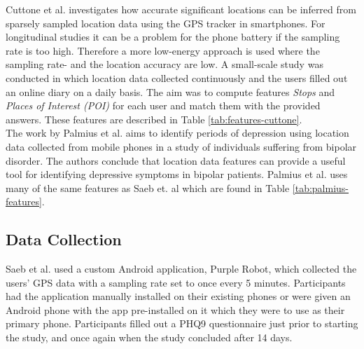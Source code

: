 


Cuttone et al. \cite{sparse-location-2014} investigates how accurate significant locations can be inferred from sparsely sampled location data using the GPS tracker in smartphones. For longitudinal studies it can be a problem for the phone battery if the sampling rate is too high. Therefore a more low-energy approach is used where the sampling rate- and the location accuracy are low. A small-scale study was conducted in which location data collected continuously and the users filled out an online diary on a daily basis. The aim was to compute features \textit{Stops} and \textit{Places of Interest (POI)} for each user and match them with the provided answers. These features are described in Table \ref{tab:features-cuttone}. \\



The work by Palmius et al. \cite{palmius2017} aims to identify periods of depression using location data collected from mobile phones in a study of individuals suffering from bipolar disorder. The authors conclude that location data features can provide a useful tool for identifying depressive symptoms in bipolar patients. Palmius et al. uses many of the same features as Saeb et. al \cite{Saeb2015, saeb2016} which are found in Table \ref{tab:palmius-features}.



\subsection{Data Collection}
Saeb et al. used a custom Android application, Purple Robot, which collected the users' GPS data with a sampling rate set to once every 5 minutes. Participants had the application manually installed on their existing phones or were given an Android phone with the app pre-installed on it which they were to use as their primary phone. Participants filled out a PHQ9 questionnaire just prior to starting the study, and once again when the study concluded after 14 days.\\


